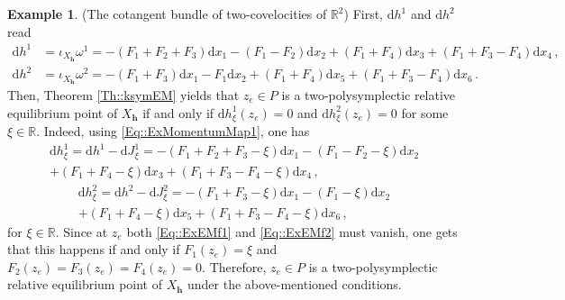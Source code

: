 \documentclass[11pt]{article}
\theoremstyle{plain}
\theoremstyle{definition}
\newtheorem{example}[theorem]{Example}
\newcommand{\R}{\mathbb{R}}
\newcommand{\bh}{{\boldsymbol{h}}}
\renewcommand{\d}{\mathrm{d}}
\newcommand*{\inn}[1]{\iota_{#1}}
\def\d{\mathrm{d}}
\numberwithin{equation}{section}
\begin{document}
\begin{example}{(The cotangent bundle of two-covelocities of $\R^2$)}
First, $\d h^1$ and $\d h^2$ read
\begin{align*}
\d h^1 &= \inn{X_{\bm h}}\omega^1=-\left(F_1+F_2+F_3\right)\d x_1-\left(F_1-F_2 \right)\d x_2+\left(F_1+F_4 \right)\d x_3+\left(F_1+F_3-F_4\right)\d x_4\,,\\
\d h^2 &= \inn{X_{\bm h}}\omega^2=-\left( F_1+F_3\right)\d x_1-F_1\d x_2+\left(F_1+F_4\right)\d x_5+\left(F_1+F_3-F_4 \right)\d x_6\,.
\end{align*}
Then, Theorem \ref{Th::ksymEM} yields that $z_e\in P$ is a two-polysymplectic relative equilibrium point of $X_\bh$ if and only if $\d h^1_\xi(z_e)=0$ and $\d h^2_{\xi}(z_e)=0$ for some $\xi\in \mathbb{R}$. Indeed, using \eqref{Eq::ExMomentumMap1}, one has
\begin{multline}
\label{Eq::ExEMf1}
    \d h_\xi^1 = \d h^1 - \d J^1_\xi=-\left(F_1+F_2+F_3-\xi\right)\d x_1-\left(F_1-F_2-\xi\right)\d x_2\\+\left(F_1+F_4-\xi\right)\d x_3+\left(F_1+F_3-F_4-\xi\right)\d x_4\,,
\end{multline}
\begin{multline}
\label{Eq::ExEMf2}
\d h_\xi^2=\d h^2-\d J^2_\xi=-\left(F_1+F_3-\xi\right)\d x_1-\left(F_1-\xi\right)\d x_2\\+\left( F_1+F_4-\xi\right)\d x_5+\left( F_1+F_3-F_4-\xi\right)\d x_6\,,
\end{multline}
for $\xi\in\R$. Since at $z_e$ both \eqref{Eq::ExEMf1} and \eqref{Eq::ExEMf2} must vanish, one gets that this happens if and only if $F_1(z_e)=\xi$ and $F_2(z_e)=F_3(z_e)=F_4(z_e)=0$. Therefore, $z_e\in P$ is a two-polysymplectic relative equilibrium point of $X_\bh$ under the above-mentioned conditions. 


\end{example}
\end{document}
